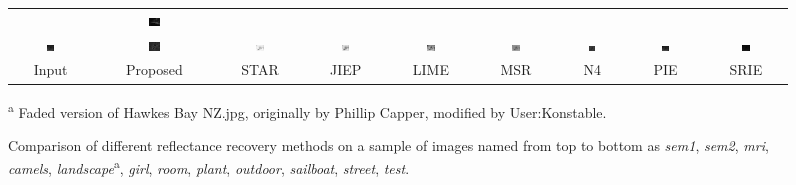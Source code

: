 \documentclass[a4paper,10pt]{article}
\begin{document}
\begin{figure}
\begin{tabular}{ccccccccc}
&
\includegraphics[width=0.1055\textwidth]{images/street_srie}%
\\
\includegraphics[width=0.1055\textwidth]{images/test_gray}\!\!\!\!\!\!
&
\includegraphics[width=0.1055\textwidth]{images/test_dgkv}\!\!\!\!\!\!
&
\includegraphics[width=0.1055\textwidth]{images/test_star}\!\!\!\!\!\!
&
\includegraphics[width=0.1055\textwidth]{images/test_jiep}\!\!\!\!\!\!
&
\includegraphics[width=0.1055\textwidth]{images/test_lime}\!\!\!\!\!\!
&
\includegraphics[width=0.1055\textwidth]{images/test_msr}\!\!\!\!\!\!
&
\includegraphics[width=0.1055\textwidth]{images/test_N4}\!\!\!\!\!\!
&
\includegraphics[width=0.1055\textwidth]{images/test_pie}\!\!\!\!\!\!
&
\includegraphics[width=0.1055\textwidth]{images/test_srie}%
\\
Input & Proposed & STAR & JIEP & LIME & MSR & N4  & PIE & SRIE
\end{tabular}
\caption*{\label{fig:images} Comparison of different reflectance recovery methods on a sample of images named from top to bottom as \textit{sem1}, \textit{sem2}, \textit{mri}, \textit{camels}, \textit{landscape}\textsuperscript{a}, \textit{girl}, \textit{room}, \textit{plant}, \textit{outdoor}, \textit{sailboat}, \textit{street}, \textit{test}.}
\textsuperscript{a} {\small Faded version of Hawkes Bay NZ.jpg,  originally by Phillip Capper, modified by User:Konstable.}
\end{figure}
\end{document}
